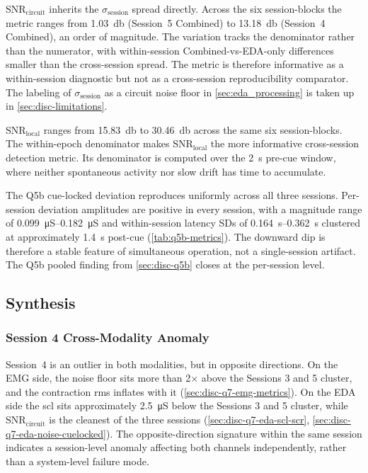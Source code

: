$\text{SNR}_\text{circuit}$ inherits the $\sigma_\text{session}$ spread directly. Across the six session-blocks the metric ranges from \SI{1.03}{\decibel} (Session~5 Combined) to \SI{13.18}{\decibel} (Session~4 Combined), an order of magnitude. The variation tracks the denominator rather than the numerator, with within-session Combined-vs-EDA-only differences smaller than the cross-session spread. The metric is therefore informative as a within-session diagnostic but not as a cross-session reproducibility comparator. The labeling of $\sigma_\text{session}$ as a circuit noise floor in \autoref{sec:eda_processing} is taken up in \autoref{sec:disc-limitations}.

$\text{SNR}_\text{local}$ ranges from \SI{15.83}{\decibel} to \SI{30.46}{\decibel} across the same six session-blocks. The within-epoch denominator makes $\text{SNR}_\text{local}$ the more informative cross-session detection metric. Its denominator is computed over the \SI{2}{\second} pre-cue window, where neither spontaneous activity nor slow drift has time to accumulate.

The Q5b cue-locked deviation reproduces uniformly across all three sessions. Per-session deviation amplitudes are positive in every session, with a magnitude range of \SIrange{0.099}{0.182}{\micro\siemens} and within-session latency SDs of \SIrange{0.164}{0.362}{\second} clustered at approximately \SI{1.4}{\second} post-cue (\autoref{tab:q5b-metrics}). The downward dip is therefore a stable feature of simultaneous operation, not a single-session artifact. The Q5b pooled finding from \autoref{sec:disc-q5b} closes at the per-session level.

\subsection{Synthesis}
\label{sec:disc-rep-synthesis}

\subsubsection{Session 4 Cross-Modality Anomaly}
\label{sec:disc-rep-synthesis-s4}

Session~4 is an outlier in both modalities, but in opposite directions. On the EMG side, the noise floor sits more than 2$\times$ above the Sessions 3 and 5 cluster, and the contraction \gls{rms} inflates with it (\autoref{sec:disc-q7-emg-metrics}). On the EDA side the \gls{scl} sits approximately \SI{2.5}{\micro\siemens} below the Sessions 3 and 5 cluster, while $\text{SNR}_\text{circuit}$ is the cleanest of the three sessions (\autoref{sec:disc-q7-eda-scl-scr}, \autoref{sec:disc-q7-eda-noise-cuelocked}). The opposite-direction signature within the same session indicates a session-level anomaly affecting both channels independently, rather than a system-level failure mode.

